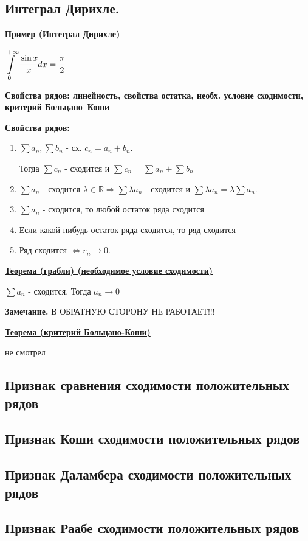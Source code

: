 \documentclass{article}
\newcommand{\integral}[2]{\displaystyle\int\limits_{#1}^{#2}}
\newcommand{\thmm}[1]{\underline{\textbf{#1}}}
\begin{document}
\subsection{Интеграл Дирихле.}

\textbf{Пример (Интеграл Дирихле)}

$\integral{0}{+\infty}\cfrac{\sin x}{x}dx  =\cfrac{\pi}{2}$

\textbf{Свойства рядов: линейность, свойства остатка, необх. условие сходимости, критерий Больцано--Коши}

\textbf{Свойства рядов:}

\begin{enumerate}
    \item $\sum a_n , \sum b_n$ - сх. $c_n = a_n + b_n$.

        Тогда $\sum c_n$ - сходится и $\sum c_n = \sum a_n + \sum b_n$
    \item $\sum a_n$  - сходится $\lambda\in \mathbb{R} \Rightarrow \sum\lambda a_n$ - сходится и $\sum \lambda a_n = \lambda \sum a_n$.
    \item $\sum a_n$ - сходится, то любой остаток ряда сходится
    \item Если какой-нибудь остаток ряда сходится, то ряд сходится
    \item Ряд сходится $\Leftrightarrow r_n \rightarrow 0 $.
\end{enumerate}

\thmm{Теорема (грабли) (необходимое условие сходимости)}

$\sum a_n$ - сходится. Тогда $a_n \rightarrow 0$


\textbf{Замечание.} В ОБРАТНУЮ СТОРОНУ НЕ РАБОТАЕТ!!!

\thmm{Теорема (критерий Больцано-Коши)}

не смотрел

\subsection{Признак сравнения сходимости положительных рядов}
\subsection{Признак Коши сходимости положительных рядов}
\subsection{Признак Даламбера сходимости положительных рядов}
\subsection{Признак Раабе сходимости положительных рядов}
\end{document}
